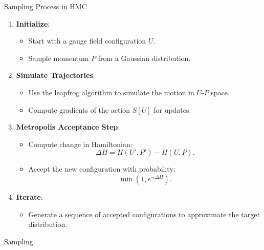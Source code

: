 \documentclass{beamer}
\begin{document}
\begin{frame}{Sampling Process in HMC}
  \begin{enumerate}
      \item \textbf{Initialize}:
      \begin{itemize}
          \item Start with a gauge field configuration \(U\).
          \item Sample momentum \(P\) from a Gaussian distribution.
      \end{itemize}
      \item \textbf{Simulate Trajectories}:
      \begin{itemize}
          \item Use the leapfrog algorithm to simulate the motion in \(U\)-\(P\) space.
          \item Compute gradients of the action \(S[U]\) for updates.
      \end{itemize}
      \item \textbf{Metropolis Acceptance Step}:
      \begin{itemize}
          \item Compute change in Hamiltonian:
          \[
          \Delta H = H(U', P') - H(U, P).
          \]
          \item Accept the new configuration with probability:
          \[
          \min(1, e^{-\Delta H}).
          \]
      \end{itemize}
      \item \textbf{Iterate}:
      \begin{itemize}
          \item Generate a sequence of accepted configurations to approximate the target distribution.
      \end{itemize}
  \end{enumerate}
\end{frame}
\begin{frame}{Sampling}
    \centering
\end{frame}
\end{document}
